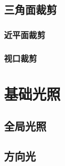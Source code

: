 \documentclass[12pt,oneside,a4paper]{ctexart}
\begin{document}
\subsection{三角面裁剪}
\subsubsection{近平面裁剪}
\subsubsection{视口裁剪}
\section{基础光照}
\subsection{全局光照}
\subsection{方向光}
\end{document}
